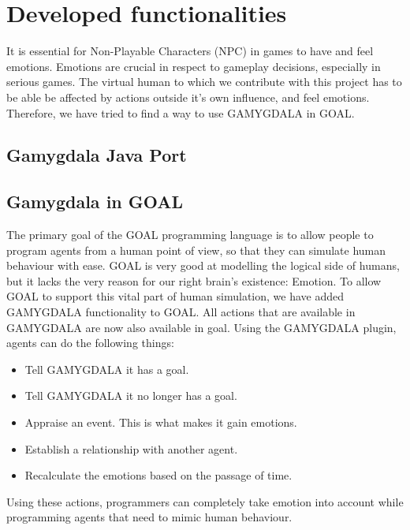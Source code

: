 \section{Developed functionalities}
It is essential for Non-Playable Characters (NPC) in games to have and feel emotions. Emotions are crucial in respect to gameplay decisions, especially in serious games. The virtual human to which we contribute with this project has to be able be affected by actions outside it's own influence, and feel emotions. Therefore, we have tried to find a way to use GAMYGDALA \citep{gamygdala} in GOAL.

\subsection{Gamygdala Java Port}


\subsection{Gamygdala in GOAL}
The primary goal of the GOAL programming language is to allow people to program agents from a human point of view, so that they can simulate human behaviour with ease. GOAL is very good at modelling the logical side of humans, but it lacks the very reason for our right brain's existence: Emotion. To allow GOAL to support this vital part of human simulation, we have added GAMYGDALA functionality to GOAL. All actions that are available in GAMYGDALA are now also available in goal. Using the GAMYGDALA plugin, agents can do the following things:
\begin{itemize}
	\item Tell GAMYGDALA it has a goal.
	\item Tell GAMYGDALA it no longer has a goal.
	\item Appraise an event. This is what makes it gain emotions.
	\item Establish a relationship with another agent.
	\item Recalculate the emotions based on the passage of time.
\end{itemize}
Using these actions, programmers can completely take emotion into account while programming agents that need to mimic human behaviour.